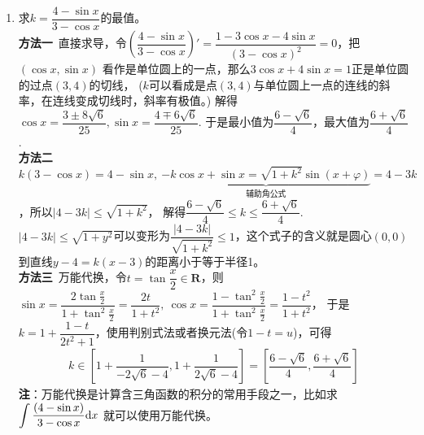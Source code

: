 \begin{enumerate}[label={【\textbf{例\thechapter.\arabic*}】},
 leftmargin=\inteval{\myenumleftmargin}pt,
 itemsep=\inteval{\myenumitempsep}pt,
 itemindent=\inteval{\myenumitemindent}pt]
\textbf{注}\ 对于已知$ \lambda_1\sin\alpha+\lambda_2\cos\alpha=\lambda_3 $的题目，
可设$ \lambda_1\cos\alpha-\lambda_2\sin\alpha=\lambda_4 $，
(注意不是$ \lambda_1\sin\alpha-\lambda_2\cos\alpha=\lambda_4 $)，
将两式$ \begin{cases}
    \lambda_1\sin\alpha+\lambda_2\cos\alpha=\lambda_3 \\
    \lambda_1\cos\alpha-\lambda_2\sin\alpha=\lambda_4
\end{cases} $平方后相加可得：
\begin{gather*}
    \lambda_1^2+\lambda_2^2=\lambda_3^2+\lambda_4^2 
\end{gather*}
于是$ \lambda_4=\pm \sqrt{\lambda_1^2+\lambda_2^2-\lambda_3^2} $. 
在得到$ \lambda_4 $之后，可使用加减消元法解出$ \cos\alpha$ 和 $\sin\alpha $. 

\item \label{分式三角求值域} 求$ k=\dfrac{4-\sin x}{3-\cos x} $的最值。\\
\textbf{方法一}\ 直接求导，令$ \left(\dfrac{4-\sin x}{3-\cos x}\right)'
=\dfrac{1-3\cos x-4\sin x}{(3-\cos x)^2}=0 $，把$ (\cos x,\sin x) $
看作是单位圆上的一点，那么$ 3\cos x+4\sin x=1 $正是单位圆的过点$ (3,4) $的切线，
($ k $可以看成是点$ (3,4) $与单位圆上一点的连线的斜率，在连线变成切线时，斜率有极值。)
解得$ \cos x=\dfrac{3\pm 8\sqrt{6}}{25},\sin x=\dfrac{4\mp 6\sqrt{6}}{25} $. 
于是最小值为$ \dfrac{6-\sqrt{6}}{4} $，最大值为$ \dfrac{6+\sqrt{6}}{4} $. \\
\textbf{方法二}\ $ k(3-\cos x)=4-\sin x,\ \underbrace{-k\cos x +\sin x=
    \sqrt{1+k^2}\sin(x+\varphi)}_{\text{辅助角公式}}=4-3k $，所以$ |4-3k|\leq\sqrt{1+k^2} $，
解得$ \dfrac{6-\sqrt{6}}{4}\leq k \leq \dfrac{6+\sqrt{6}}{4}  $. \\
$ |4-3k|\leq\sqrt{1+y^2} $可以变形为$ \dfrac{|4-3k|}{\sqrt{1+k^2}}
\leq 1 $，这个式子的含义就是圆心$ (0,0) $到直线$ y-4=k(x-3) $的距离小于等于半径1。\\
\textbf{方法三}\ 万能代换，令$ t=\tan\dfrac{x}{2}\in \textbf{R} $，则$ \sin x=
\dfrac{2\tan\frac{x}{2}}{1+\tan^2\frac{x}{2}}=\dfrac{2t}{1+t^2},\ \cos x=\dfrac{1-\tan^2\frac{x}{2}}{1+\tan^2\frac{x}{2}}=\dfrac{1-t^2}{1+t^2} $，
于是$ k=1+\dfrac{1-t}{2t^2+1} $，使用判别式法或者换元法(令$ 1-t=u $)，可得
\begin{gather*}
    k\in \left[1+\dfrac{1}{-2\sqrt{6}-4}, 
    1+\dfrac{1}{2\sqrt{6}-4} \right]=\left[\dfrac{6-\sqrt{6}}{4},
    \dfrac{6+\sqrt{6}}{4}\right]
\end{gather*}
\textbf{注}：万能代换是计算含三角函数的积分的常用手段之一，比如求
$ \displaystyle{ \int\dfrac{(4-\sin x)}{3-\cos x}\mathrm{d}x } $
就可以使用万能代换。


\end{enumerate}
